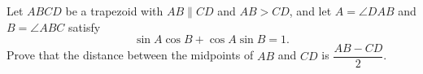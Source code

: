 Let $ABCD$ be a trapezoid with $AB\parallel CD$ and $AB>CD$, and let $A=\angle DAB$ and $B=\angle ABC$ satisfy
\[\sin A\cos B+\cos A\sin B=1.\]
Prove that the distance between the midpoints of $AB$ and $CD$ is $\dfrac{AB-CD}{2}$.
